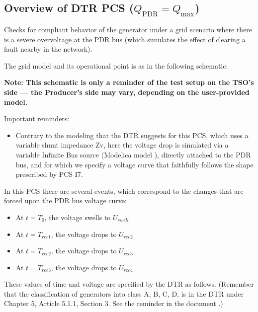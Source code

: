     \subsection{Overview of DTR PCS \DTRPcs{} ($Q_\text{PDR} = Q_\text{max}$)}

    Checks for compliant behavior of the generator under a grid scenario where
    there is a severe overvoltage at the PDR bus (which simulates the
    effect of clearing a fault nearby in the network).

    The grid model and its operational point is as in the following schematic:
    \begin{center}
        
    \end{center}
    \begin{center}
        \small \textbf{Note: This schematic is only a reminder of the test setup on the TSO's
        side --- the Producer's side may vary, depending on the user-provided model.}
    \end{center}

    \noindent Important reminders:
    \begin{itemize}
        \item Contrary to the modeling that the DTR suggests for this PCS, which uses a
        variable shunt impedance Zv, here the voltage drop is simulated via a variable
        Infinite Bus source (Modelica model ), directly
        attached to the PDR bus, and for which we specify a voltage curve that
        faithfully follows the shape prescribed by PCS I7.
    \end{itemize}

    In this PCS there are several events, which correspond to the changes that are
    forced upon the PDR bus voltage curve:
    \begin{itemize}
        \item At $t = T_{0}$, the voltage swells to $U_{swell}$
        \item At $t = T_{rec1}$, the voltage drops to $U_{rec2}$
        \item At $t = T_{rec2}$, the voltage drops to $U_{rec3}$
        \item At $t = T_{rec3}$, the voltage drops to $U_{rec4}$
    \end{itemize}
    These values of time and voltage are specified by the DTR as follows. (Remember
    that the classification of generators into class A, B, C, D, is in the DTR under
    Chapter 5, Article 5.1.1, Section 3. See the reminder in the document
    .)

